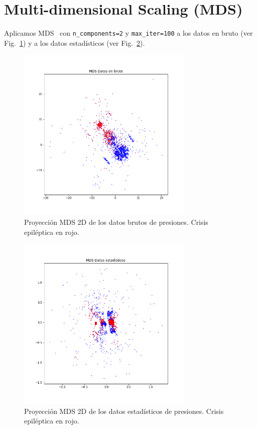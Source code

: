 \documentclass[a4paper,12pt,twoside,oldfontcommands]{memoir}
\begin{document}
\section{Multi-dimensional Scaling (MDS)}
Aplicamos MDS~\cite{kruskal1964nonmetric,borg2003modern} con \texttt{n\_components=2} y \texttt{max\_iter=100} a los datos en bruto (ver Fig.~\ref{fig:mdsDB}) y a los datos estadísticos (ver Fig.~\ref{fig:mdsDE}).
\begin{figure}
    \centering
    \includegraphics[width=0.75\textwidth]{images/mdsDB.png}
    \caption{Proyección MDS 2D de los datos brutos de presiones. Crisis epiléptica en rojo.}
    \label{fig:mdsDB}
\end{figure}
\begin{figure}
    \centering
    \includegraphics[width=0.75\textwidth]{images/mdsDE.png}
    \caption{Proyección MDS 2D de los datos estadísticos de presiones. Crisis epiléptica en rojo.}
    \label{fig:mdsDE}
\end{figure}
\end{document}
